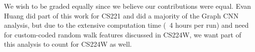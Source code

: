 We wish to be graded equally since we believe
our contributions were equal. Evan Huang did part of this work for CS221 and did a majority of the 
Graph CNN analysis, but due to the extensive computation time (~4 hours per run) and need
for custom-coded random walk features discussed in CS224W, we want part of this analysis to count for CS224W as well.
